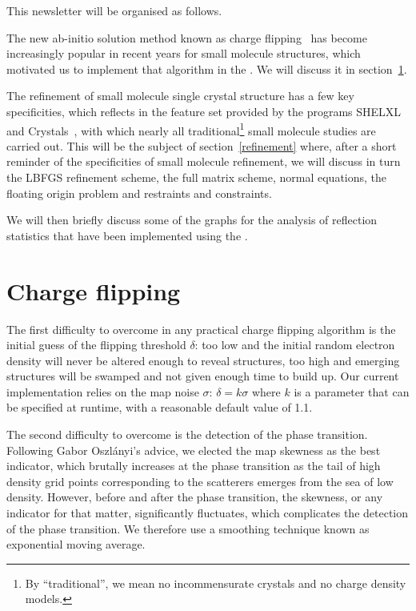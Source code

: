 \documentclass[12pt]{article}
\begin{document}
This newsletter will be organised as follows.

The new ab-initio solution method known as charge flipping~\cite{Oszlanyi:2008,Palatinus:2007} has become increasingly popular in recent years for small molecule structures, which motivated us to implement that algorithm in the \smtbx. We will discuss it in section~\ref{chargeflipping}.

The refinement of small molecule single crystal structure has a few key specificities, which reflects in the feature set provided by the programs SHELXL~\cite{Sheldrick:2008} and Crystals~\cite{Crystals:v12}, with which nearly all traditional\footnote{By ``traditional'', we mean no incommensurate crystals and no charge density models.} small molecule studies are carried out.
This will be the subject of section~\ref{refinement} where, after a short reminder of the specificities of small molecule refinement, we will discuss in turn the LBFGS refinement scheme, the full matrix scheme, normal equations, the floating origin problem and restraints and constraints.

We will then briefly discuss some of the graphs for the analysis of reflection statistics that have been implemented using the \cctbx.


\section{Charge flipping}
\label{chargeflipping}
The first difficulty to overcome in any practical charge flipping algorithm is the initial guess of the flipping threshold $\delta$: too low and the initial random electron density will never be altered enough to reveal structures, too high and emerging structures will be swamped and not given enough time to build up. Our current implementation relies on the map noise $\sigma$: $\delta = k \sigma$ where $k$ is a parameter that can be specified at runtime, with a reasonable default value of 1.1.

The second difficulty to overcome is the detection of the phase transition.  Following Gabor Oszl{\'a}nyi's advice, we elected the map skewness as the best indicator, which brutally increases at the phase transition as the tail of high density grid points corresponding to the scatterers emerges from the sea of low density. However, before and after the phase transition, the skewness, or any indicator for that matter, significantly fluctuates, which complicates the detection of the phase transition. We therefore use a smoothing technique known as exponential moving average.
\end{document}
